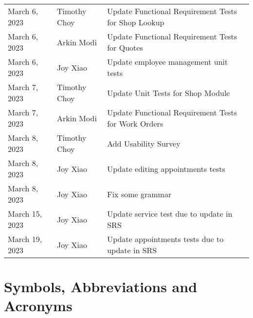 \documentclass[12pt, titlepage]{article}
\begin{document}
\begin{longtable}{p{} p{} p{}}
	March 6, 2023    & Timothy Choy          & Update Functional Requirement Tests for Shop Lookup         \\
	March 6, 2023    & Arkin Modi            & Update Functional Requirement Tests for Quotes              \\
	March 6, 2023    & Joy Xiao              & Update employee management unit tests                       \\
	March 7, 2023    & Timothy Choy          & Update Unit Tests for Shop Module                           \\
	March 7, 2023    & Arkin Modi            & Update Functional Requirement Tests for Work Orders         \\
	March 8, 2023    & Timothy Choy          & Add Usability Survey                                        \\
	March 8, 2023    & Joy Xiao              & Update editing appointments tests                           \\
	March 8, 2023    & Joy Xiao              & Fix some grammar                                            \\
	March 15, 2023   & Joy Xiao              & Update service test due to update in SRS                    \\
	March 19, 2023   & Joy Xiao              & Update appointments tests due to update in SRS              \\
	\bottomrule
\end{longtable}

\newpage

\tableofcontents

\listoftables

\listoffigures

\newpage

\section{Symbols, Abbreviations and Acronyms}
\end{document}
